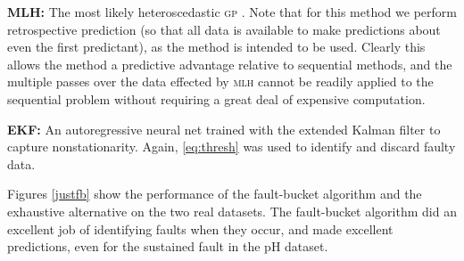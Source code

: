 \documentclass[twoside]{article}
\newcommand{\given}{\!\ensuremath{\mid}\!}
\newcommand{\bm}[1]{\ensuremath{\mathbf{#1}}}
\newcommand{\acro}[1]{\textsc{\MakeLowercase{#1}}}
\newcommand{\vect}[1]{\bm{#1}}
\newcommand{\vy}{\vect{y}}
\newcommand{\mean}[2]{{m}(#1\given#2)}
\begin{document}

{\bf MLH:} 
The most likely heteroscedastic  \acro{gp} \citep{kersting2007most}. Note that for this method we perform retrospective prediction (so that all data is available to make predictions about even the first predictant), as the method is intended to be used. Clearly this allows the method a predictive advantage relative to sequential methods, and the multiple passes over the data effected by \acro{mlh} cannot be readily applied to the sequential problem without requiring a great deal of expensive computation. 

{\bf EKF:}
An autoregressive neural net trained with the extended Kalman filter to capture nonstationarity. Again, \eqref{eq:thresh} was used to identify and discard faulty data.






Figures \ref{justfb} show the performance of the
fault-bucket algorithm and the exhaustive alternative on the two real datasets. The fault-bucket algorithm did an excellent
job of identifying faults when they occur, and made excellent
predictions, even for the sustained fault in the pH dataset. 
\end{document}

